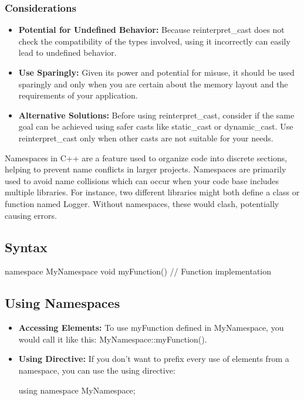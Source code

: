 \documentclass{report}
\begin{document}
\begin{concept}
    \bigbreak \noindent 
    \subsubsection{Considerations}
    \begin{itemize}
        \item \textbf{Potential for Undefined Behavior:} Because reinterpret\_cast does not check the compatibility of the types involved, using it incorrectly can easily lead to undefined behavior.
        \item \textbf{Use Sparingly:} Given its power and potential for misuse, it should be used sparingly and only when you are certain about the memory layout and the requirements of your application.
        \item \textbf{Alternative Solutions:} Before using reinterpret\_cast, consider if the same goal can be achieved using safer casts like static\_cast or dynamic\_cast. Use reinterpret\_cast only when other casts are not suitable for your needs.
    \end{itemize}

    \pagebreak 
    \bigbreak \noindent 
    \begin{concept}
        Namespaces in C++ are a feature used to organize code into discrete sections, helping to prevent name conflicts in larger projects. 
        \bigbreak \noindent 
        Namespaces are primarily used to avoid name collisions which can occur when your code base includes multiple libraries. For instance, two different libraries might both define a class or function named Logger. Without namespaces, these would clash, potentially causing errors.
    \end{concept}

    \bigbreak \noindent 
    \subsection{Syntax}
    \bigbreak \noindent 
    \begin{cppcode}
    namespace MyNamespace {
        void myFunction() {
            // Function implementation
        }
    }
    \end{cppcode}

    \bigbreak \noindent 
    \subsection{Using Namespaces}
    \bigbreak \noindent 
    \begin{itemize}
        \item \textbf{Accessing Elements:} To use myFunction defined in MyNamespace, you would call it like this: MyNamespace::myFunction().
        \item \textbf{Using Directive:} If you don't want to prefix every use of elements from a namespace, you can use the using directive:
            \bigbreak \noindent 
            \begin{cppcode}
            using namespace MyNamespace;
            \end{cppcode}
    \end{itemize}


\end{concept}
\end{document}
